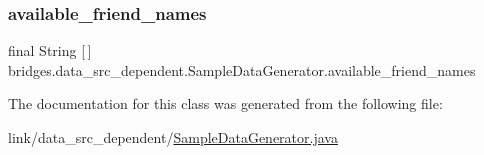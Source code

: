 \subsubsection{\texorpdfstring{available\+\_\+friend\+\_\+names}{available\_friend\_names}}
{\footnotesize\ttfamily final String \mbox{[}$\,$\mbox{]} bridges.\+data\+\_\+src\+\_\+dependent.\+Sample\+Data\+Generator.\+available\+\_\+friend\+\_\+names\hspace{0.3cm}{\ttfamily [static]}}



The documentation for this class was generated from the following file\+:\begin{DoxyCompactItemize}
\item 
link/data\+\_\+src\+\_\+dependent/\hyperlink{_sample_data_generator_8java}{Sample\+Data\+Generator.\+java}\end{DoxyCompactItemize}
